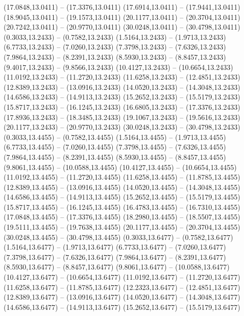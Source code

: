 {\begin{scope}[shift={(#1,#2)}]
    (17.0848,13.0411) -- (17.3376,13.0411)
    (17.6914,13.0411) -- (17.9441,13.0411)
    (18.9045,13.0411) -- (19.1573,13.0411)
    (20.1177,13.0411) -- (20.3704,13.0411)
    (20.7242,13.0411) -- (20.9770,13.0411)
    (30.0248,13.0411) -- (30.4798,13.0411)
    (0.3033,13.2433) -- (0.7582,13.2433)
    (1.5164,13.2433) -- (1.9713,13.2433)
    (6.7733,13.2433) -- (7.0260,13.2433)
    (7.3798,13.2433) -- (7.6326,13.2433)
    (7.9864,13.2433) -- (8.2391,13.2433)
    (8.5930,13.2433) -- (8.8457,13.2433)
    (9.4017,13.2433) -- (9.8566,13.2433)
    (10.4127,13.2433) -- (10.6654,13.2433)
    (11.0192,13.2433) -- (11.2720,13.2433)
    (11.6258,13.2433) -- (12.4851,13.2433)
    (12.8389,13.2433) -- (13.0916,13.2433)
    (14.0520,13.2433) -- (14.3048,13.2433)
    (14.6586,13.2433) -- (14.9113,13.2433)
    (15.2652,13.2433) -- (15.5179,13.2433)
    (15.8717,13.2433) -- (16.1245,13.2433)
    (16.6805,13.2433) -- (17.3376,13.2433)
    (17.8936,13.2433) -- (18.3485,13.2433)
    (19.1067,13.2433) -- (19.5616,13.2433)
    (20.1177,13.2433) -- (20.9770,13.2433)
    (30.0248,13.2433) -- (30.4798,13.2433)
    (0.3033,13.4455) -- (0.7582,13.4455)
    (1.5164,13.4455) -- (1.9713,13.4455)
    (6.7733,13.4455) -- (7.0260,13.4455)
    (7.3798,13.4455) -- (7.6326,13.4455)
    (7.9864,13.4455) -- (8.2391,13.4455)
    (8.5930,13.4455) -- (8.8457,13.4455)
    (9.8061,13.4455) -- (10.0588,13.4455)
    (10.4127,13.4455) -- (10.6654,13.4455)
    (11.0192,13.4455) -- (11.2720,13.4455)
    (11.6258,13.4455) -- (11.8785,13.4455)
    (12.8389,13.4455) -- (13.0916,13.4455)
    (14.0520,13.4455) -- (14.3048,13.4455)
    (14.6586,13.4455) -- (14.9113,13.4455)
    (15.2652,13.4455) -- (15.5179,13.4455)
    (15.8717,13.4455) -- (16.1245,13.4455)
    (16.4783,13.4455) -- (16.7310,13.4455)
    (17.0848,13.4455) -- (17.3376,13.4455)
    (18.2980,13.4455) -- (18.5507,13.4455)
    (19.5111,13.4455) -- (19.7638,13.4455)
    (20.1177,13.4455) -- (20.3704,13.4455)
    (30.0248,13.4455) -- (30.4798,13.4455)
    (0.3033,13.6477) -- (0.7582,13.6477)
    (1.5164,13.6477) -- (1.9713,13.6477)
    (6.7733,13.6477) -- (7.0260,13.6477)
    (7.3798,13.6477) -- (7.6326,13.6477)
    (7.9864,13.6477) -- (8.2391,13.6477)
    (8.5930,13.6477) -- (8.8457,13.6477)
    (9.8061,13.6477) -- (10.0588,13.6477)
    (10.4127,13.6477) -- (10.6654,13.6477)
    (11.0192,13.6477) -- (11.2720,13.6477)
    (11.6258,13.6477) -- (11.8785,13.6477)
    (12.2323,13.6477) -- (12.4851,13.6477)
    (12.8389,13.6477) -- (13.0916,13.6477)
    (14.0520,13.6477) -- (14.3048,13.6477)
    (14.6586,13.6477) -- (14.9113,13.6477)
    (15.2652,13.6477) -- (15.5179,13.6477)

\end{scope}}
